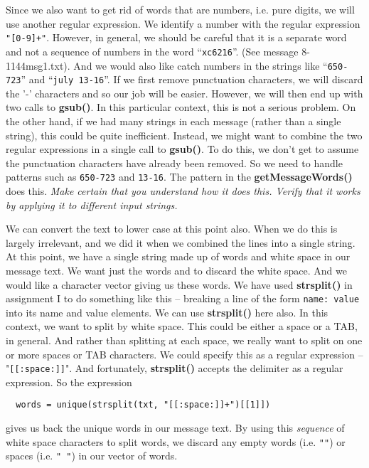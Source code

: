 \documentclass{article}
\def\SFunction#1{\textbf{#1()}}
\begin{document}
Since we also want to get rid of words that are numbers, i.e. pure
digits, we will use another regular expression.  We identify a number
with the regular expression \verb|"[0-9]+"|.  However, in general, we
should be careful that it is a separate word and not a sequence of
numbers in the word ``\texttt{xc6216}''. (See message 8-1144msg1.txt).
And we would also like catch numbers in the strings like
``\texttt{650-723}'' and ``\texttt{july 13-16}''.  If we first remove
punctuation characters, we will discard the '-' characters and so our
job will be easier.  However, we will then end up with two calls to
\SFunction{gsub}. In this particular context, this is not a serious
problem. On the other hand, if we had many strings in each message
(rather than a single string), this could be quite inefficient.
Instead, we might want to combine the two regular expressions in a
single call to \SFunction{gsub}.  To do this, we don't get to assume
the punctuation characters have already been removed.  So we need to
handle patterns such as \texttt{650-723} and \texttt{13-16}.  The
pattern in the \SFunction{getMessageWords} does this.  \textit{Make
  certain that you understand how it does this. Verify that it works
  by applying it to different input strings.}

We can convert the text to lower case at this point also.  When we do this
is largely irrelevant, and we did it when we combined the
lines into a single string.  At this point, we have a single string
made up of words and white space in our message text.  We want just
the words and to discard the white space.  And we would like a
character vector giving us these words.  We have used
\SFunction{strsplit} in assignment I to do something like this --
breaking a line of the form \texttt{name: value} into its name and
value elements.  We can use \SFunction{strsplit} here also.  In this
context, we want to split by white space.  This could be either a
space or a TAB, in general.  And rather than splitting at each space,
we really want to split on one or more spaces or TAB characters.  We
could specify this as a regular expression -- "\verb|[[:space:]]|".
And fortunately, \SFunction{strsplit} accepts the delimiter as a
regular expression.
So the expression
\begin{verbatim}
  words = unique(strsplit(txt, "[[:space:]]+")[[1]])
\end{verbatim}
gives us back the unique words in our message text.  By using this
\textit{sequence} of white space characters to split words, we discard
any empty words (i.e. \verb+""+) or spaces (i.e. \verb+" "+) in our
vector of words.
\end{document}
